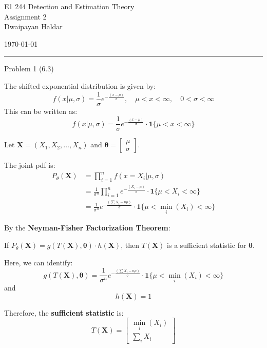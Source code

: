 \documentclass[12pt,a4paper,onecolumn]{exam}
\newcommand{\questionheader}[1]{%
  \begin{tcolorbox}[
    enhanced,
    colback=black,
    coltext=white,
    boxrule=0pt,
    fontupper=\Large\bfseries,
    arc=4mm
  ]
  #1
  \end{tcolorbox}%
}
\begin{document}
\begingroup
    \centering
    \LARGE E1 244 Detection and Estimation Theory\\
    \LARGE Assignment 2\\[0.5em]
    \large Dwaipayan Haldar\par
    \large \today\\[0.5em] 
\endgroup
\noindent\rule{\textwidth}{0.5pt}
\printanswers
\renewcommand{\solutiontitle}{\noindent\textbf{Ans:}\enspace}

\questionheader{Problem 1 (6.3)}

\begin{solution}
The shifted exponential distribution is given by:
\[
f(x|\mu, \sigma) = \frac{1}{\sigma} e^{-\frac{(x-\mu)}{\sigma}}, \quad \mu < x < \infty, \quad 0 < \sigma < \infty
\]
This can be written as:
\[
f(x|\mu, \sigma) = \frac{1}{\sigma} e^{-\frac{(x-\mu)}{\sigma}} \cdot \mathbf{1}\{\mu < x < \infty\}
\]

Let $\mathbf{X} = (X_1, X_2, \ldots, X_n)$ and $\boldsymbol{\theta} = \begin{bmatrix} \mu \\ \sigma \end{bmatrix}$.

The joint pdf is:
\begin{align*}
P_{\theta}(\mathbf{X}) &= \prod_{i=1}^{n} f(x = X_i | \mu, \sigma) \\
&= \frac{1}{\sigma^n} \prod_{i=1}^{n} e^{-\frac{(X_i - \mu)}{\sigma}} \cdot \mathbf{1}\{\mu < X_i < \infty\} \\
&= \frac{1}{\sigma^n} e^{-\frac{(\sum X_i - n\mu)}{\sigma}} \cdot \mathbf{1}\{\mu < \min_i(X_i) < \infty\}
\end{align*}

By the \textbf{Neyman-Fisher Factorization Theorem}:

If $P_{\theta}(\mathbf{X}) = g(T(\mathbf{X}), \boldsymbol{\theta}) \cdot h(\mathbf{X})$, then $T(\mathbf{X})$ is a sufficient statistic for $\boldsymbol{\theta}$.

Here, we can identify:
\[
g(T(\mathbf{X}), \boldsymbol{\theta}) = \frac{1}{\sigma^n} e^{-\frac{(\sum X_i - n\mu)}{\sigma}} \cdot \mathbf{1}\{\mu < \min_i(X_i) < \infty\}
\]
and
\[
h(\mathbf{X}) = 1
\]

Therefore, the \textbf{sufficient statistic} is:
\[
\boxed{T(\mathbf{X}) = \begin{bmatrix} \min_i(X_i) \\ \sum_i X_i \end{bmatrix}}
\]
\end{solution}
\end{document}

